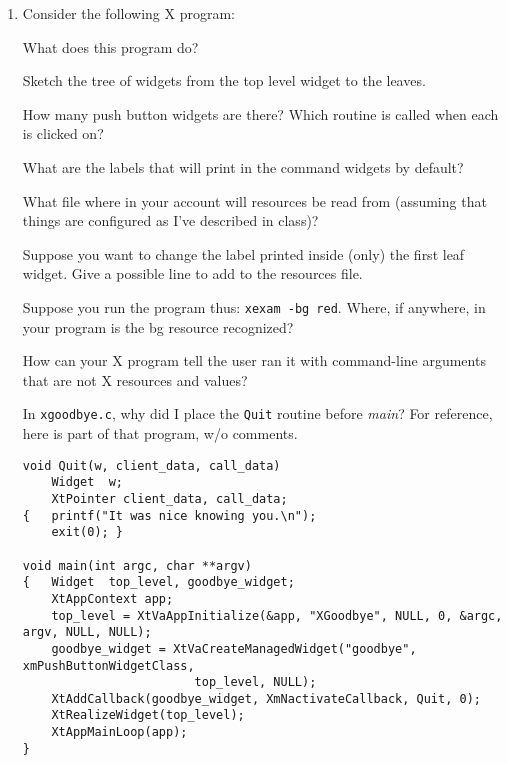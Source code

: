 \documentclass[twoside]{article}
\begin{document}
\begin{enumerate}
\item Consider the following X program:


\begin{enumerate}

 What does this program do?

 Sketch the tree of widgets from the top level widget to
the leaves.

 How many push button widgets are there?  Which routine is called
when each is clicked on?

 What are the labels that will print in the command widgets by default?

 What file where in your account will resources be read from (assuming that
things are configured as I've described in class)?

 Suppose you want to change the label printed inside (only) the first
leaf widget.  Give a possible line to add to the resources
file.

 Suppose you run the program thus: {\tt xexam -bg red}.
Where, if anywhere, in your program is the bg resource recognized?

\end{enumerate}



  How can your X program tell the user ran it with
command-line arguments that are not X resources and values?

 In \texttt{xgoodbye.c}, why did I place the \texttt{Quit} routine before
\emph{main}?  For reference, here is part of that program, w/o comments.

\begin{verbatim}
void Quit(w, client_data, call_data)
    Widget  w;
    XtPointer client_data, call_data;
{   printf("It was nice knowing you.\n");
    exit(0); }

void main(int argc, char **argv)
{   Widget  top_level, goodbye_widget;
    XtAppContext app;
    top_level = XtVaAppInitialize(&app, "XGoodbye", NULL, 0, &argc, argv, NULL, NULL);
    goodbye_widget = XtVaCreateManagedWidget("goodbye", xmPushButtonWidgetClass, 
						top_level, NULL);
    XtAddCallback(goodbye_widget, XmNactivateCallback, Quit, 0);
    XtRealizeWidget(top_level);      
    XtAppMainLoop(app);      
}
\end{verbatim}




\end{enumerate}
\end{document}
